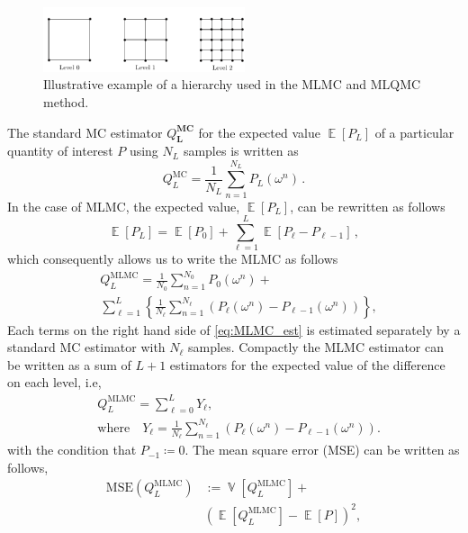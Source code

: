 \documentclass{ICASP13Paper}
\DeclareMathOperator{\E}{\mathbb{E}}
\DeclareMathOperator{\V}{\mathbb{V}}
\begin{document}
\begin{figure}
\centering
\includegraphics[height=1.9cm]{Grid.pdf}
\caption{Illustrative example of a hierarchy used in the MLMC and MLQMC method.}
\label{fig:gridrefinement}
\end{figure}

The standard MC estimator $Q^{\mathbf{MC}}_{\mathbf{L}}$ for the expected value $\E\left[P_L\right]$ of a particular quantity of interest $P$ using $N_L$ samples is written as
\begin{equation}
Q^{\textrm{MC}}_L={\frac{1}{N_L}}\sum_{n=1}^{N_L} P_L(\omega^n)\,.
\label{eq:MC_est}
\end{equation}
In the case of MLMC, the expected value, $\E\left[P_L\right]$, can be rewritten as follows
\begin{equation}
\E[P_L]=\E[P_0]+\sum_{\ell=1}^L \E[P_\ell -P_{\ell-1}]\,,
\end{equation}
which consequently allows us to write the MLMC as follows
\begin{equation}
\begin{split}
&Q^{\textrm{MLMC}}_L= \frac{1}{N_0}\sum_{n=1}^{N_0} P_0(\omega^{n}) + \\
& \sum_{\ell=1}^L \left \{ \frac{1}{N_\ell} \sum_{n=1}^{N_\ell} \left( P_\ell(\omega^{n})-P_{\ell-1}(\omega^{n})\right) \right \},
\end{split}
\label{eq:MLMC_est}
\end{equation}
Each terms on the right hand side of \eqref{eq:MLMC_est} is estimated separately by a standard MC estimator with $N_\ell$ samples. Compactly the MLMC estimator can be written as a sum of $L + 1 $ estimators for the expected value of the difference on each level, i.e,
\begin{equation}
\begin{split}
&Q^{\textrm{MLMC}}_L = \sum_{\ell = 0}^L Y_{\ell}, \quad \\
& \text{where} \quad Y_{\ell} = \frac{1}{N_\ell} \sum_{n=1}^{N_\ell} \left( P_\ell(\omega^{n})-P_{\ell-1}(\omega^{n})\right).
\end{split}
\end{equation}
with the condition that $P_{-1}\coloneqq0$.
The mean square error (MSE) can be written as follows,
\begin{equation}
\begin{split}
\textrm{MSE}(Q^{\textrm{MLMC}}_L) & := \V\left[Q^{\textrm{MLMC}}_L\right] + \\
&\left(\E\left[Q^{\textrm{MLMC}}_L\right] - \E\left[P\right]\right)^2,
\end{split}
\end{equation}
\end{document}
